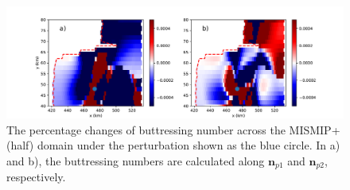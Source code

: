 \documentclass[review,oneside]{igs}
\begin{document}
\begin{figure}
	\centering
    \includegraphics[width=1\linewidth]{figs/sigma_change_example.pdf}
    \caption{The percentage changes of buttressing number across the MISMIP+ (half) domain under the perturbation shown as the blue circle. In a) and b), the buttressing numbers are calculated along $\mathbf{n}_{p1}$ and $\mathbf{n}_{p2}$, respectively.}
	\label{sigma_change_example}
\end{figure}
\end{document}

